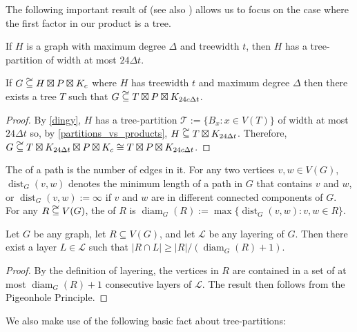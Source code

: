 \documentclass{patmorin}
\DeclareMathOperator{\dist}{dist}
\DeclareMathOperator{\diam}{diam}
\newcommand\subsetcong{\mathrel{\text{%
    \setbox0\hbox{$\subseteq$}%
    \rlap{\hbox to \wd0{\hss\hss\hss\raisebox{1.5\height}{$\sim$}\hss}}\box0
}}}
\renewcommand{\ge}{\geqslant}
\begin{document}
The following important result of \citet{ding.oporowski:some} (see also \citet{wood:on}) allows us to focus on the case where the first factor in our product is a tree.

\begin{thm}\label{dingy}
  If $H$ is a graph with maximum degree $\Delta$ and treewidth $t$, then $H$ has a tree-partition of width at most $24\Delta t$.
\end{thm}

\begin{cor}\label{ding_translation}
  If $G\subsetcong H\boxtimes P\boxtimes K_c$ where $H$ has treewidth $t$ and maximum degree $\Delta$ then there exists a tree $T$ such that $G\subsetcong T\boxtimes P\boxtimes K_{24c\Delta t}$.
\end{cor}

\begin{proof}
  By \cref{dingy}, $H$ has a tree-partition $\mathcal{T}:=\{B_x:x\in V(T)\}$ of width at most $24\Delta t$ so, by \cref{partitions_vs_products}, $H \subsetcong T\boxtimes K_{24\Delta t}$.  Therefore, $G\subsetcong T\boxtimes K_{24\Delta t}\boxtimes P\boxtimes K_c \cong T\boxtimes P\boxtimes K_{24c\Delta t}$.
\end{proof}

The  of a path is the number of edges in it. For any two vertices $v,w\in V(G)$, $\dist_G(v,w)$ denotes the minimum length of a path in $G$ that contains $v$ and $w$, or $\dist_G(v,w):=\infty$ if $v$ and $w$ are in different connected components of $G$. For any $R\subsetcong V(G)$, the  of $R$ is $\diam_G(R):=\max\{\dist_G(v,w):v,w\in R\}$.

\begin{obs}\label{diameter_spread}
  Let $G$ be any graph, let $R\subseteq V(G)$, and let $\mathcal{L}$ be any layering of $G$.  Then there exist a layer $L\in\mathcal{L}$ such that $|R\cap L|\ge |R|/(\diam_G(R)+1)$.
\end{obs}

\begin{proof}
  By the definition of layering, the vertices in $R$ are contained in a set of at most $\diam_G(R)+1$ consecutive layers of $\mathcal{L}$. The result then follows from the Pigeonhole Principle.
\end{proof}


We also make use of the following basic fact about tree-partitions:
\end{document}
